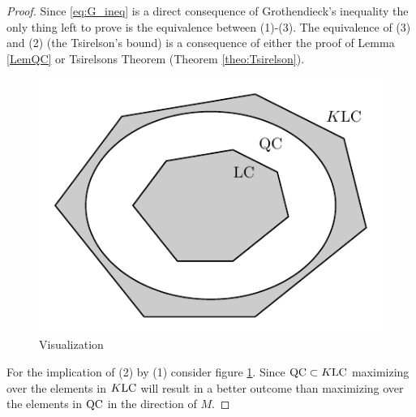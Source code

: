 	\begin{frame}
		\begin{proof}
			Since \eqref{eq:G_ineq} is a direct consequence of Grothendieck's inequality the only thing left to prove is the equivalence between (1)-(3). The equivalence of (3) and (2) (the Tsirelson's bound) is a consequence of either the proof of Lemma \ref{LemQC} or Tsirelsons Theorem (Theorem \ref{theo:Tsirelson}).
			
			\begin{figure}
				\includegraphics[scale=1]{ChapersPresentation/fig_QC&LC.pdf}
				\caption{Visualization } \label{fig:QCLC}
			\end{figure}
			
			For the implication of (2) by (1) consider figure \ref{fig:QCLC}. Since $\textup{QC}\subset K\textup{LC}$ maximizing over the elements in $K\textup{LC}$ will result in a better outcome than maximizing over the elements in $\textup{QC}$ in the direction of $M$.
		\end{proof}
	\end{frame}